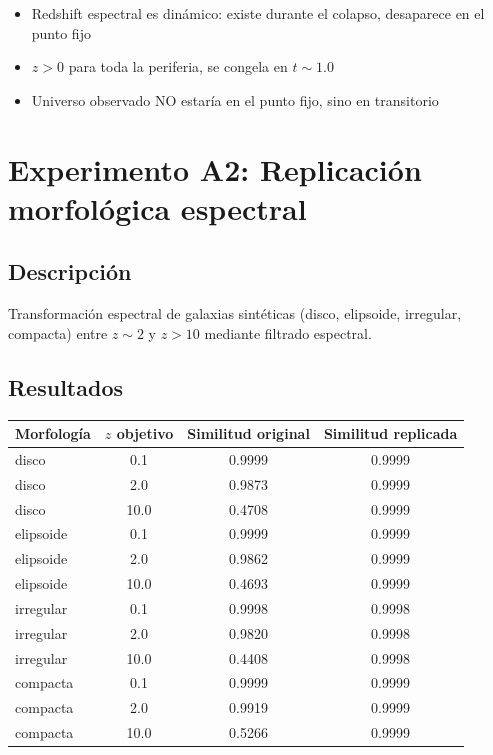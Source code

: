\documentclass[12pt]{article}
\begin{document}
\begin{itemize}
  \item Redshift espectral es din\'amico: existe durante el colapso, desaparece en el punto fijo
  \item $z > 0$ para toda la periferia, se congela en $t \sim 1.0$
  \item Universo observado NO estar\'ia en el punto fijo, sino en transitorio
\end{itemize}

\section{Experimento A2: Replicaci\'on morfol\'ogica espectral}

\subsection{Descripci\'on}
Transformaci\'on espectral de galaxias sint\'eticas (disco, elipsoide, irregular, compacta) entre $z\sim 2$ y $z > 10$ mediante filtrado espectral.

\subsection{Resultados}
\begin{center}
\begin{tabular}{lccc}
\toprule
Morfolog\'ia & $z$ objetivo & Similitud original & Similitud replicada \\
\midrule
disco & 0.1 & 0.9999 & 0.9999 \\
disco & 2.0 & 0.9873 & 0.9999 \\
disco & 10.0 & 0.4708 & 0.9999 \\
elipsoide & 0.1 & 0.9999 & 0.9999 \\
elipsoide & 2.0 & 0.9862 & 0.9999 \\
elipsoide & 10.0 & 0.4693 & 0.9999 \\
irregular & 0.1 & 0.9998 & 0.9998 \\
irregular & 2.0 & 0.9820 & 0.9998 \\
irregular & 10.0 & 0.4408 & 0.9998 \\
compacta & 0.1 & 0.9999 & 0.9999 \\
compacta & 2.0 & 0.9919 & 0.9999 \\
compacta & 10.0 & 0.5266 & 0.9999 \\
\bottomrule
\end{tabular}
\end{center}
\end{document}
